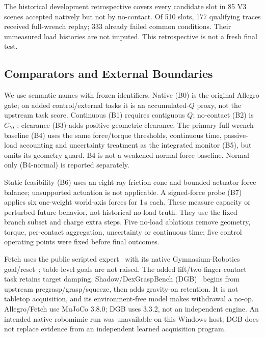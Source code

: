 \documentclass[conference,10pt,letterpaper]{IEEEtran}
\newcommand{\NC}{C_{\mathrm{NC}}}
\begin{document}
The historical development retrospective covers every candidate slot in 85
V3 scenes accepted natively but not by no-contact. Of 510 slots, 177 qualifying
traces received full-wrench replay; 333 already failed common conditions.
Their unmeasured load histories are not imputed. This retrospective is not a
fresh final test.

\subsection{Comparators and External Boundaries}
We use semantic names with frozen identifiers. Native (B0) is the original
Allegro gate; on added control/external tasks it is an accumulated-$Q$ proxy,
not the upstream task score. Continuous (B1) requires contiguous $Q$;
no-contact (B2) is $\NC$; clearance (B3) adds positive geometric clearance.
The primary full-wrench baseline (B4) uses the same force/torque thresholds,
continuous time, passive-load accounting and uncertainty treatment as the
integrated monitor (B5), but omits its geometry guard. B4 is not a weakened
normal-force baseline. Normal-only (B4-normal) is reported separately.

Static feasibility (B6) uses an eight-ray friction cone and bounded actuator
force balance; unsupported actuation is not applicable. A signed-force probe
(B7) applies six one-weight world-axis forces for 1\,s each. These measure
capacity or perturbed future behavior, not historical no-load truth. They use
the fixed branch subset and charge extra steps. Five no-load ablations remove
geometry, torque, per-contact aggregation, uncertainty or continuous time;
five control operating points were fixed before final outcomes.

Fetch uses the public scripted expert~\cite{fetch_expert} with its native
Gymnasium-Robotics goal/reset~\cite{gymnasium_robotics}; table-level goals are
not raised. The added lift/two-finger-contact task retains target damping.
Shadow/DexGraspBench (DGB)~\cite{dexgraspbench} begins from upstream
pregrasp/grasp/squeeze, then adds gravity-on retention. It is not tabletop
acquisition, and its environment-free model makes withdrawal a no-op.
Allegro/Fetch use MuJoCo 3.8.0; DGB uses 3.3.2, not an independent engine.
An intended native robomimic run was unavailable on this Windows host; DGB
does not replace evidence from an independent learned acquisition program.
\end{document}
